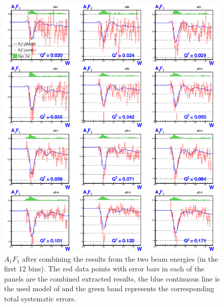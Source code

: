 \begin{figure}[H] %
  \centering
  \leavevmode \includegraphics[width=1.0\textwidth]{figuresEG4/FigResults/combinedA1F1_C71S181EbBothNoQeWbins70NwPd.png} 
  \caption[Combined $A_1 F_1$ (in first 12 \qsqs bins)]{$A_1 F_1$ after combining the results from the two beam energies (in the first 12 \qsqs bins). The red data points with error bars in each of the panels are the combined extracted results, the blue continuous line is the used model of \gones and the green band represents the corresponding total systematic errors.}
  \label{extA1F1comb4}  
\end{figure}


